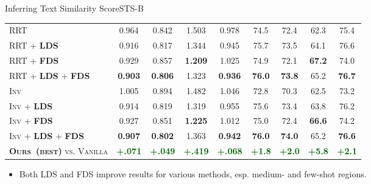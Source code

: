\begin{frame}{Inferring Text Similarity Score}{STS-B}
\begin{table}[!htbp]
\begin{center}
{\begin{tabular}{l|cccc|cccc}
					\textsc{RRT}         & 0.964 & 0.842 & 1.503  & 0.978 & 74.5 & 72.4 & 62.3  & 75.4 \\[1.2pt]
					\textsc{RRT} + \textbf{\textsc{LDS}}     & {0.916} & 0.817 & {1.344}  & 0.945 & {75.7} & {73.5} & {64.1}  & {76.6} \\[1.2pt]
					\textsc{RRT} + \textbf{\textsc{FDS}} & 0.929 & 0.857 & \textbf{1.209}  & 1.025     & 74.9     & 72.1     & \textbf{67.2}      & 74.0 \\[1.2pt]
					\textsc{RRT} + \textbf{\textsc{LDS}} + \textbf{\textsc{FDS}} & \textbf{0.903} & \textbf{0.806} & 1.323  & \textbf{0.936}     & \textbf{76.0}     &\textbf{73.8}     & 65.2      & \textbf{76.7} \\ \midrule\midrule
					\textsc{Inv}      & 1.005 & 0.894 & 1.482  & 1.046 & 72.8 & 70.3 & 62.5  & 73.2 \\[1.2pt]
					\textsc{Inv} + \textbf{\textsc{LDS}} & 0.914 & 0.819 & {1.319}  & {0.955} & {75.6} & {73.4} & {63.8}  & {76.2} \\[1.2pt]
					\textsc{Inv} + \textbf{\textsc{FDS}} & 0.927 & 0.851 & \textbf{1.225}  & 1.012     & 75.0     & 72.4     & \textbf{66.6}      & 74.2 \\[1.2pt]
					\textsc{Inv} + \textbf{\textsc{LDS}} + \textbf{\textsc{FDS}} & \textbf{0.907} & \textbf{0.802} & 1.363  & \textbf{0.942}     & \textbf{76.0}     & \textbf{74.0}     & 65.2      & \textbf{76.6} \\ \midrule\midrule
					\textsc{\textbf{Ours~(best)} vs. Vanilla}   & \textcolor{darkgreen}{\textbf{+.071}} & \textcolor{darkgreen}{\textbf{+.049}} & \textcolor{darkgreen}{\textbf{+.419}} & \textcolor{darkgreen}{\textbf{+.068}} & \textcolor{darkgreen}{\textbf{+1.8}} & \textcolor{darkgreen}{\textbf{+2.0}} & \textcolor{darkgreen}{\textbf{+5.8}} & \textcolor{darkgreen}{\textbf{+2.1}} \\
					\bottomrule[1.5pt]
				\end{tabular}
			}
		\end{center}
	\end{table}
	\begin{itemize}
		\item Both LDS and FDS improve results for various methods, esp. medium- and few-shot regions.
	\end{itemize}
\end{frame}

